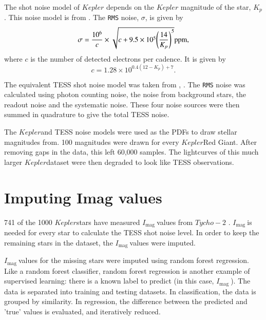 \documentclass[a4paper,fleqn,usenatbib,useAMS]{mnras}
\newcommand{\kep}{\ensuremath{Kepler}\:}
\newcommand{\imag}{\ensuremath{I_{\textrm{mag}}\:}}
\begin{document}
The shot noise model of $Kepler$ depends on the $Kepler$ magnitude of the star, $K_{p}$. This noise model is from \citet{gilliland_initial_2010}. The \texttt{RMS} noise, $\sigma$, is given by
\begin{equation}
\sigma = \frac{10^{6}}{c} \times \sqrt{c+9.5 \times 10^{5}\Bigg(\frac{14}{K_{p}}\Bigg)^{5}}  {\rm ppm},
\label{eq:kep noise}
\end{equation}
where $c$ is the number of detected electrons per cadence. It is given by
\begin{equation}
c = 1.28 \times 10^{0.4(12-K_{p})+7} .
\end{equation}

The equivalent TESS shot noise model was taken from \citet{sullivan_transiting_2015}, \citet{campante_asteroseismic_2016}. The \texttt{RMS} noise was calculated using photon counting noise, the noise from background stars, the readout noise and the systematic noise. These four noise sources were then summed in quadrature to give the total TESS noise.

The \kep and TESS noise models were used as the PDFs to draw stellar magnitudes from. 100 magnitudes were drawn for every \kep Red Giant. After removing gaps in the data, this left 60,000 samples. The lightcurves of this much larger \kep dataset were then degraded to look like TESS observations.



\section{Imputing Imag values}

741 of the 1000 \kep stars have measured \imag values from $Tycho-2$ \citep{hog_tycho-2_2000}. \imag is needed for every star to calculate the TESS shot noise level. In order to keep the remaining stars in the dataset, the \imag values were imputed.

\imag values for the missing stars were imputed using random forest regression. Like a random forest classifier, random forest regression is another example of supervised learning: there is a known label to predict (in this case, \imag). The data is separated into training and testing datasets. In classification, the data is grouped by similarity. In regression, the difference between the predicted and 'true' values is evaluated, and iteratively reduced. 
\end{document}
